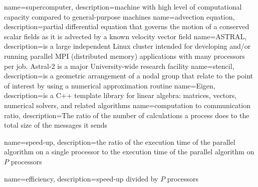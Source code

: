 
{
	name={supercomputer},
	description={machine with high level of computational capacity compared to general-purpose machines}
}
{
	name={advection equation},
	description={partial differential equation that governs the motion of a conserved scalar fields as it is advected by a known velocity vector field \cite{bib:advection}}
}
{
	name={ASTRAL},
	description={is a large independent Linux cluster intended for developing and/or running parallel \gls{MPI} (distributed memory) applications with many processors per job. Astral-2 is a major University-wide research facility \cite{bib:astral}}
}
{
	name={stencil},
	description={is a geometric arrangement of a nodal group that relate to the point of interest by using a numerical approximation routine \cite{bib:stencil}}
}
{
	name={Eigen},
	description={is a C++ template library for linear algebra: matrices, vectors, numerical solvers, and related algorithms \cite{bib:eigen}}
}
{
	name={computation to communication ratio},
	description={The ratio of the number of calculations a process does to the total size of the messages it sends \cite{bib:hpc-glossary}}
}

{
	name={speed-up},
	description={the ratio of the execution time of the parallel algorithm on a single processor to the execution time of the parallel algorithm on $P$ processors \cite{bib:lectures-hpc}}
}

{
	name={efficiency},
	description={\gls{speed-up} divided by $P$ processors \cite{bib:lectures-hpc}}
}
